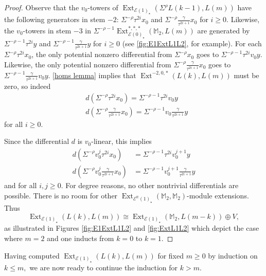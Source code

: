 \documentclass{amsart}
\theoremstyle{plain}
\numberwithin{equation}{section}
\numberwithin{figure}{section}
\DeclareMathOperator{\Ext}{Ext}
\newcommand{\mM}{{\mathbb M}}
\newcommand{\mR}{{\mathbb R}}
\newcommand{\cE}{{\mathcal E}}
\newcommand{\0}{\langle 0 \rangle }
\begin{document}
\begin{proof}
Observe that the $v_{0}$-towers of $\Ext_{\cE(1)_{\star}}(\Sigma^{\rho}L(k-1), L(m))$ have the following generators in stem $-2$: $\Sigma^{-\rho}\tau^{2i}x_{0}$ and $\Sigma^{-\rho}\frac{\gamma}{\tau^{2i + 1}}{x_{0}}$ for $i \ge 0$. Likewise, the $v_{0}$-towers in stem $-3$ in $\Sigma^{-\rho - 1}\Ext_{\cE(0)_{\star}}^{*,*,*}( \mM_{2}, L(m))$ are generated by $\Sigma^{-\rho - 1}\tau^{2i}y$ and $\Sigma^{-\rho - 1}\frac{\gamma}{\tau^{2i + 1}}y$ for $i \ge 0$ (see \cref{fig:E1ExtL1L2}, for example). For each $\Sigma^{-\rho}\tau^{2i}x_{0}$, the only potential nonzero differential from $\Sigma^{-\rho}x_{0}$ goes to $\Sigma^{-\rho - 1}\tau^{2i}v_{0}y$. Likewise, the only potential nonzero differential from $\Sigma^{-\rho}\frac{\gamma}{\tau^{2i + 1}}{x_{0}}$ goes to $\Sigma^{-\rho - 1}\frac{\gamma}{\tau^{2i + 1}}v_{0}y$. \cref{homs lemma} implies that $\Ext^{-2,0,*}( L(k), L(m) )$ must be zero, so indeed
\begin{align*}
    & d(\Sigma^{-\rho}\tau^{2i}x_{0}) = \Sigma^{-\rho - 1}\tau^{2i}v_{0}y \\
    & d(\Sigma^{-\rho}\frac{\gamma}{\tau^{2i + 1}}{x_{0}}) = \Sigma^{-\rho - 1}v_{0}\frac{\gamma}{\tau^{2i + 1}}y
\end{align*} 
for all $i \ge 0$.  

Since the differential $d$ is $v_{0}$-linear, this implies 
\begin{align*}
    d(\Sigma^{-\rho}v_{0}^{j}\tau^{2i}x_{0}) & = \Sigma^{-\rho - 1}\tau^{2i}v_{0}^{j+1}y \\
    d(\Sigma^{-\rho}v_{0}^{j}\frac{\gamma}{\tau^{2i + 1}}{x_{0}}) & = \Sigma^{-\rho - 1}v_{0}^{j+1}\frac{\gamma}{\tau^{2i + 1}}y
\end{align*} and for all $i,j \ge 0$. For degree reasons, no other nontrivial differentials are possible. There is no room for other $\Ext_{\cE^{\mR}(1)_{\star}}(\mM_{2}, \mM_{2})$-module extensions. Thus
\[\Ext_{\cE(1)_{\star}}(L(k), L(m)) \cong \Ext_{\cE(1)_{\star}}(\mM_{2}, L(m-k)) \oplus V,\]
as illustrated in Figures \ref{fig:E1ExtL1L2} and \ref{fig:ExtL1L2} which depict the case where $m =2$ and one inducts from $k=0$ to $k = 1.$
\end{proof}

Having computed $\Ext_{\cE(1)_{\star}}(L(k), L(m))$ for fixed $m \geq 0$ by induction on $k \le m,$ we are now ready to continue the induction for $k > m.$ 
\end{document}
